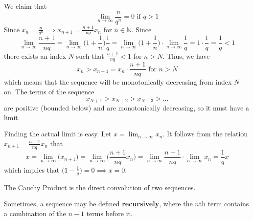   \begin{example}
    \label{ex:claim-since-since}
    We claim that 
    \begin{equation}
      \lim_{n\rightarrow \infty} \frac{n}{q^n} = 0 \text{ if } q>1
    \end{equation}
    Since $x_n = \frac{n}{q^n} \implies x_{n+1} = \frac{n+1}{nq} x_n$ for $n \in \mathbb{N}$. Since 
    \begin{equation}
      \lim_{n\rightarrow \infty} \frac{n+1}{nq} = \lim_{n \rightarrow \infty} \bigg(1 + \frac{1}{n}\bigg) \frac{1}{q} = \lim_{n\rightarrow \infty} \bigg( 1 + \frac{1}{n} \bigg) \cdot \lim_{n\rightarrow \infty} \frac{1}{q} = 1 \cdot \frac{1}{q} = \frac{1}{q} < 1
    \end{equation}
    there exists an index $N$ such that $\frac{n+1}{nq} < 1$ for $n>N$. Thus, we have 
    \begin{equation}
      x_n > x_{n+1} = x_n \cdot \frac{n+1}{nq} \text{ for } n > N
    \end{equation}
    which means that the sequence will be monotonically decreasing from index $N$ on. The terms of the sequence
    \begin{equation}
      x_{N+1} > x_{N+2} > x_{N+3} > \ldots
    \end{equation}
    are positive (bounded below) and are monotonically decreasing, so it must have a limit. 

    Finding the actual limit is easy. Let $x = \lim_{n \rightarrow \infty} x_n$. It follows from the relation $x_{n+1} = \frac{n+1}{nq} x_n$ that
    \begin{equation}
      x = \lim_{n\rightarrow \infty} \big(x_{n+1}\big) = \lim_{n \rightarrow \infty} \bigg(\frac{n+1}{nq} x_n \bigg) = \lim_{n \rightarrow \infty} \frac{n+1}{nq} \cdot \lim_{n \rightarrow \infty} x_n = \frac{1}{q} x
    \end{equation}
    which implies that $\big( 1 - \frac{1}{q}\big) = 0 \implies x = 0$.
  \end{example}

  \begin{definition}
    \label{def:cauchy-product}
    The Cauchy Product is the direct convolution of two sequences. 
  \end{definition} 

  \begin{definition}
    \label{def:recursive-sequence}
    Sometimes, a sequence may be defined \textbf{recursively}, where the $n$th term contains a combination of the $n-1$ terms before it.  
  \end{definition}

